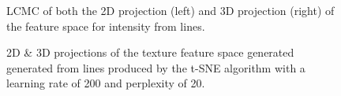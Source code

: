 \begin{figure}[H]
	\centering
	\caption{LCMC of both the 2D projection (left) and 3D projection (right) of the feature space for intensity from lines.}\label{fig:LCMC_intensity}
\end{figure}
\clearpage


\clearpage
\begin{figure}[H]
	\centering
	\caption{2D \& 3D projections of the texture feature space generated generated from lines produced by the t-SNE algorithm with a learning rate of 200 and perplexity of 20.}\label{fig:texture_SNE_mapping_lines}
\end{figure}

